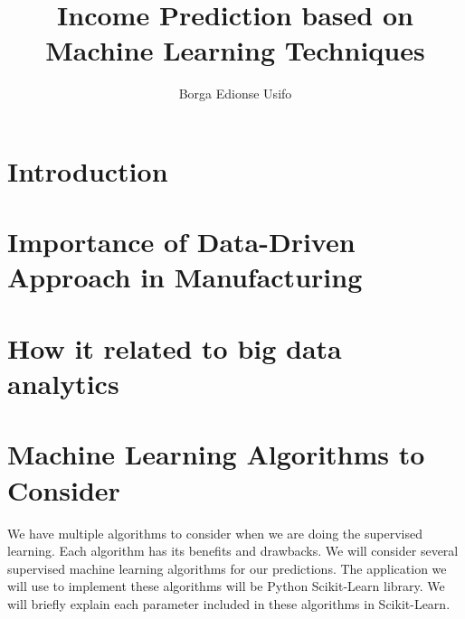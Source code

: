 \documentclass[sigconf]{acmart}
\begin{document}
\title{Income Prediction based on Machine Learning Techniques}

\author{Borga Edionse Usifo}

\renewcommand{\shortauthors}{B. Usifo et al.}

\begin{abstract}

\end{abstract}


\maketitle

\section{Introduction}




\section{Importance of Data-Driven Approach in Manufacturing}




\section{How it related to big data analytics}

 


\section{Machine Learning Algorithms to Consider}
We have multiple algorithms to consider when we are doing the supervised learning. Each algorithm has its benefits and drawbacks. We will consider several supervised machine learning algorithms for our predictions. The application we will use to implement these algorithms will be Python Scikit-Learn library. We will briefly explain each parameter included in these algorithms in Scikit-Learn.
\end{document}

